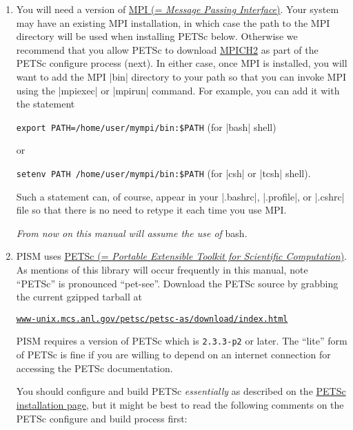 \documentclass[11pt,final]{amsart}
\newcommand{\PETSCREL}{2.3.3-p2}
\renewcommand{\t}[1]{\texttt{#1}}
\begin{document}
\begin{enumerate}
\item You will need a version of \href{http://www-unix.mcs.anl.gov/mpi/}{MPI (= \emph{Message Passing Interface})}. Your system may have an existing MPI installation, in which case the path to the MPI
  directory will be used when installing PETSc below. Otherwise we recommend that you allow PETSc to download
  \href{http://www-unix.mcs.anl.gov/mpi/mpich2/}{MPICH2} as part of the PETSc configure process (next). In either case, once MPI
  is installed, you will want to add the MPI |bin| directory to your path so that you can invoke MPI using the |mpiexec|
  or |mpirun| command. For example, you can add it with the statement

\verb|export PATH=/home/user/mympi/bin:$PATH|  \qquad (for |bash| shell)

\noindent or

\verb|setenv PATH /home/user/mympi/bin:$PATH|  \qquad (for |csh| or |tcsh| shell).

\noindent Such a statement can, of course, appear in your |.bashrc|, |.profile|, or |.cshrc| file so that there is
no need to retype it each time you use MPI.

\medskip
\begin{center}
  \emph{From now on this manual will assume the use of} bash.
\end{center}
\medskip

\item PISM uses \href{http://www-unix.mcs.anl.gov/petsc/petsc-2/index.html}{PETSc (= \emph{Portable Extensible Toolkit for
      Scientific Computation})}. As mentions of this
  library will occur frequently in this manual, note ``PETSc'' is pronounced ``pet-see''. Download the PETSc source by grabbing
  the current gzipped tarball at
   \begin{center}
    \href{http://www-unix.mcs.anl.gov/petsc/petsc-as/download/index.html}{\t{www-unix.mcs.anl.gov/petsc/petsc-as/download/index.html}}
  \end{center}
  PISM requires a version of PETSc which is \texttt{\PETSCREL} or later. The ``lite'' form of PETSc is fine if you are willing to
  depend on an internet connection for accessing the PETSc documentation.

  You should configure and build PETSc \emph{essentially} as described on the
  \href{http://www-unix.mcs.anl.gov/petsc/petsc-2/documentation/installation.html}{PETSc installation page}, but it might be best
  to read the following comments on the PETSc configure and build process first:


\end{enumerate}
\end{document}
